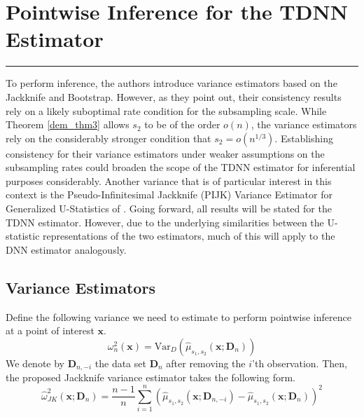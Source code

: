 \documentclass[letterpaper,10pt]{article}
\numberwithin{equation}{section}
\numberwithin{thm}{section}
\numberwithin{lem}{section}
\numberwithin{cor}{section}
\renewcommand{\hat}{\widehat}
\newcommand{\1}{\mathbbm{1}}
\newcommand{\Var}{\text{Var}}
\begin{document}
\newpage
\section{Pointwise Inference for the TDNN Estimator}\label{pw_inf}
\hrule
To perform inference, the authors introduce variance estimators based on the Jackknife and Bootstrap.
However, as they point out, their consistency results rely on a likely suboptimal rate condition for the subsampling scale.
While Theorem \ref{dem_thm3} allows $s_2$ to be of the order $o(n)$, the variance estimators rely on the considerably stronger condition that $s_2 = o(n^{1/3})$.
Establishing consistency for their variance estimators under weaker assumptions on the subsampling rates could broaden the scope of the TDNN estimator for inferential purposes considerably.
Another variance that is of particular interest in this context is the Pseudo-Infinitesimal Jackknife (PIJK) Variance Estimator for Generalized U-Statistics of \citet{peng_bias_2021}.
Going forward, all results will be stated for the TDNN estimator.
However, due to the underlying similarities between the U-statistic representations of the two estimators, much of this will apply to the DNN estimator analogously.

\subsection{Variance Estimators}\label{Var_Ests}

Define the following variance we need to estimate to perform pointwise inference at a point of interest $\mathbf{x}$.
\begin{equation}
	\omega^{2}_{n}\left(\mathbf{x}\right)
	= \Var_{D}\left(\hat{\mu}_{s_1, s_2}\left(\mathbf{x}; \mathbf{D}_n\right)\right)
\end{equation}
We denote by $\mathbf{D}_{n, -i}$ the data set $\mathbf{D}_n$ after removing the $i$'th observation.
Then, the proposed Jackknife variance estimator takes the following form.
\begin{equation}
	\hat{\omega}_{JK}^2\left(\mathbf{x}; \mathbf{D}_n\right)
	= \frac{n-1}{n} \sum_{i = 1}^{n}\left(\hat{\mu}_{s_1, s_2}\left(\mathbf{x}; \mathbf{D}_{n, -i}\right) - \hat{\mu}_{s_1, s_2}\left(\mathbf{x}; \mathbf{D}_{n}\right)\right)^2
\end{equation}
\end{document}
